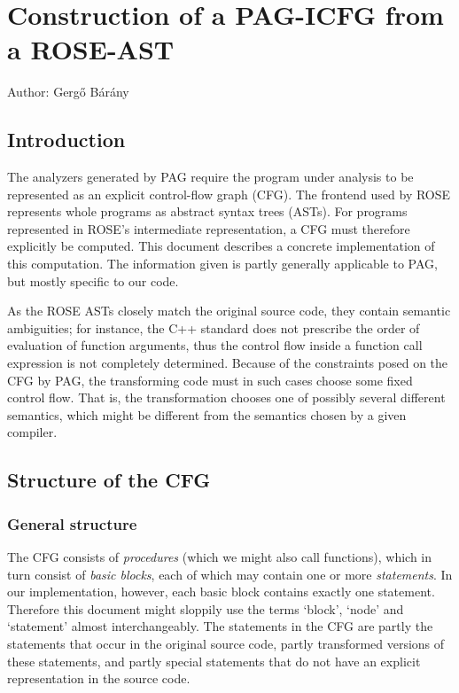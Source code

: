 \chapter{Construction of a PAG-ICFG from a ROSE-AST}

Author: Gerg\H{o} B\'ar\'any

\lstset{language=C++}
\section{Introduction}

The analyzers generated by PAG require the program under analysis to
be represented as an explicit control-flow graph (CFG). The frontend
used by ROSE represents whole programs as abstract syntax trees
(ASTs). For programs represented in ROSE's intermediate
representation, a CFG must therefore explicitly be computed. This
document describes a concrete implementation of this computation.
The information given is partly generally applicable to PAG, but
mostly specific to our code.

As the ROSE ASTs closely match the original source code, they
contain semantic ambiguities; for instance, the C++ standard does
not prescribe the order of evaluation of function arguments, thus
the control flow inside a function call expression is not completely
determined. Because of the constraints posed on the CFG by PAG, the
transforming code must in such cases choose some fixed control flow.
That is, the transformation chooses one of possibly several
different semantics, which might be different from the semantics
chosen by a given compiler.

\section{Structure of the CFG}

\subsection{General structure}

The CFG consists of \emph{procedures} (which we might also call
functions), which in turn consist of \emph{basic blocks}, each of
which may contain one or more \emph{statements}. In our
implementation, however, each basic block contains exactly one
statement. Therefore this document might sloppily use the terms
`block', `node' and `statement' almost interchangeably. The
statements in the CFG are partly the statements that occur in the
original source code, partly transformed versions of these
statements, and partly special statements that do not have an
explicit representation in the source code.

